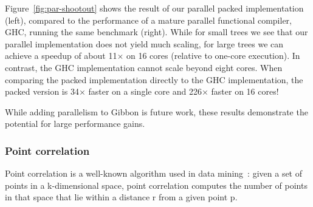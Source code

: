 \documentclass[a4paper,english]{lipics-v2016}
\newcommand{\treelang}{Gibbon\xspace} %
\begin{document}


Figure~\ref{fig:par-shootout} shows the result of our parallel packed
implementation (left), compared to the performance of a mature parallel
functional compiler, GHC, running the same benchmark (right). While for small
trees we see that our parallel implementation does not yield much scaling, for
large trees we can achieve a speedup of about 11$\times$ on 16 cores (relative
to one-core execution). In contrast, the GHC implementation cannot scale
beyond eight cores. When comparing the packed implementation directly to the
GHC implementation, the packed version is 34$\times$ faster on a single core
and 226$\times$ faster on 16 cores!

While adding parallelism to \treelang{} is future work, these results
demonstrate the potential for large performance gains.

% 


\subsubsection{Point correlation} \label{sec:eval-kdtree}
Point correlation  is a well-known algorithm used in data mining~\cite{gray2000n}:
given a set of points in a k-dimensional space, point correlation computes the number of points in that space  that lie within a
distance r from a given point p. 


\end{document}
